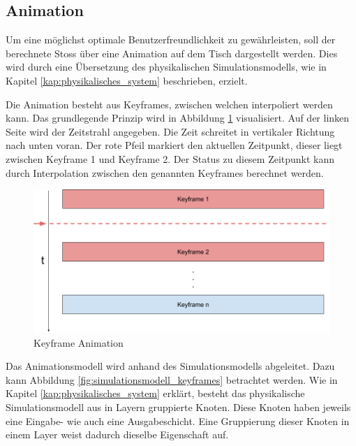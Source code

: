 \subsection{Animation}
Um eine möglichst optimale Benutzerfreundlichkeit zu gewährleisten, soll der berechnete Stoss über eine Animation
auf dem Tisch dargestellt werden. Dies wird durch eine Übersetzung des physikalischen Simulationsmodells, wie in Kapitel
\ref{kap:physikalisches_system} beschrieben, erzielt.

Die Animation besteht aus Keyframes, zwischen welchen interpoliert werden kann. Das grundlegende Prinzip wird in Abbildung
\ref{fig:keyframe_animation} visualisiert. Auf der linken Seite wird der Zeitstrahl angegeben. Die Zeit schreitet in vertikaler
Richtung nach unten voran. Der rote Pfeil markiert den aktuellen Zeitpunkt, dieser liegt zwischen Keyframe 1 und Keyframe 2.
Der Status zu diesem Zeitpunkt kann durch Interpolation zwischen den genannten Keyframes berechnet werden.

\begin{figure}[h!]
    \begin{center}
        \includegraphics[width=0.6\linewidth]{../common/03_billiard_ai/resources/31_keyframe_animation.png}
    \end{center}
    \caption{Keyframe Animation}
    \label{fig:keyframe_animation}
\end{figure}

Das Animationsmodell wird anhand des Simulationsmodells abgeleitet. Dazu kann Abbildung
\ref{fig:simulationsmodell_keyframes} betrachtet werden. Wie in Kapitel \ref{kap:physikalisches_system} erklärt, besteht
das physikalische Simulationsmodell aus in Layern gruppierte Knoten. Diese Knoten haben jeweils eine Eingabe- wie auch
eine Ausgabeschicht. Eine Gruppierung dieser Knoten in einem Layer weist dadurch dieselbe Eigenschaft auf.

